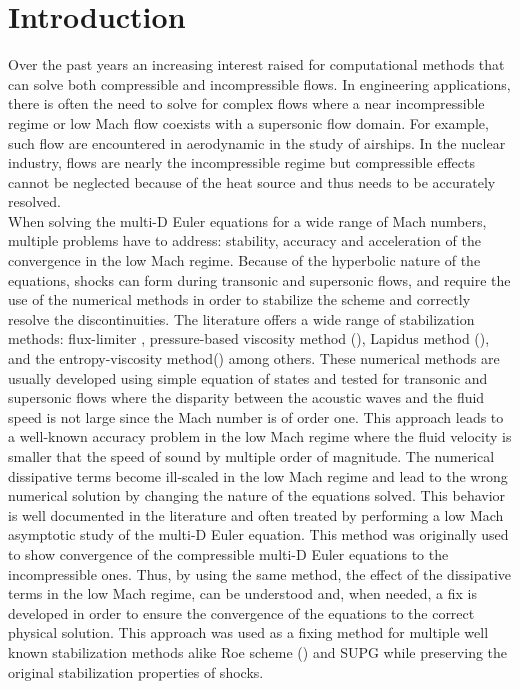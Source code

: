 \section{Introduction} \label{sec:intro}
Over the past years an increasing interest raised for computational methods that can solve both compressible and incompressible flows. In engineering applications, there is often the need to solve for complex flows where a near incompressible regime or low Mach flow coexists with a supersonic flow domain. For example, such flow are encountered in aerodynamic in the study of airships. In the nuclear industry, flows are nearly the incompressible regime but compressible effects cannot be neglected because of the heat source and thus needs to be accurately resolved. \\
When solving the multi-D Euler equations for a wide range of Mach numbers, multiple problems have to address: stability, accuracy and acceleration of the convergence in the low Mach regime. Because of the hyperbolic nature of the equations, shocks can form during transonic and supersonic flows, and require the use of the numerical methods in order to stabilize the scheme and correctly resolve the discontinuities. The literature offers a wide range of stabilization methods: flux-limiter \cite{FluxLimiter, FluxLimiter2}, pressure-based viscosity method (\cite{PBV_book}), Lapidus method (\cite{Lapidus_paper, LMP, Lapidus_book}), and the entropy-viscosity method(\cite{jlg1, jlg2}) among others. These numerical methods are usually developed using simple equation of states and tested for transonic and supersonic flows where the disparity between the acoustic waves and the fluid speed is not large since the Mach number is of order one. This approach leads to a well-known accuracy problem in the low Mach regime where the fluid velocity is smaller that the speed of sound by multiple order of magnitude. The numerical dissipative terms become ill-scaled in the low Mach regime and lead to the wrong numerical solution by changing the nature of the equations solved. This behavior is well documented in the literature \cite{LowMach1, LowMach2, LowMach3} and often treated by performing a low Mach asymptotic study of the multi-D Euler equation. This method was originally used \cite{LowMach1} to show convergence of the compressible multi-D Euler equations to the incompressible ones. Thus, by using the same method, the effect of the dissipative terms in the low Mach regime, can be understood and, when needed, a fix is developed in order to ensure the convergence of the equations to the correct physical solution. This approach was used as a fixing method for multiple well known stabilization methods alike Roe scheme (\cite{Roe}) and SUPG \cite{LowMach3} while preserving the original stabilization properties of shocks.  \\
